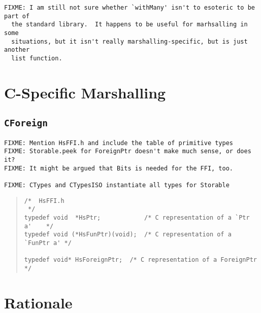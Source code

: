 \documentclass[a4paper,twosides]{article}
\newcommand{\code}[1]{\texttt{#1}}      %
\begin{document}
\begin{verbatim}
FIXME: I am still not sure whether `withMany' isn't to esoteric to be part of
  the standard library.  It happens to be useful for marhsalling in some
  situations, but it isn't really marshalling-specific, but is just another
  list function.
\end{verbatim}

\newpage
\section{C-Specific Marshalling}
\label{sec:c-marshalling}

\subsection{\code{CForeign}}

\begin{verbatim}
FIXME: Mention HsFFI.h and include the table of primitive types
FIXME: Storable.peek for ForeignPtr doesn't make much sense, or does it?
FIXME: It might be argued that Bits is needed for the FFI, too.

FIXME: CTypes and CTypesISO instantiate all types for Storable
\end{verbatim}

\begin{quote}
\begin{verbatim}
/*  HsFFI.h
 */
typedef void  *HsPtr;            /* C representation of a `Ptr a'    */
typedef void (*HsFunPtr)(void);  /* C representation of a `FunPtr a' */

typedef void* HsForeignPtr;  /* C representation of a ForeignPtr */
\end{verbatim}
\end{quote}


\appendix
\newpage
\section{Rationale}
\end{document}
